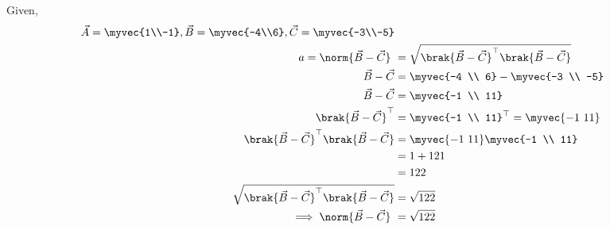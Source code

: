 \solution
Given, 
\begin{align}
\vec{A} = \myvec{1\\-1},
\vec{B} = \myvec{-4\\6},
\vec{C} = \myvec{-3\\-5} \\  
a =  \norm{\vec{B}-\vec{C}}\ &=  \sqrt{\brak{\vec{B}-\vec{C}}^{\top}\brak{\vec{B}-\vec{C}}} \\
 \vec{B}-\vec{C} &= \myvec{-4 \\ 6} - \myvec{-3 \\ -5} \\
 \vec{B}-\vec{C} &= \myvec{-1 \\ 11} \\
 \brak{\vec{B}-\vec{C}}^{\top} &= {\myvec{-1 \\ 11}}^{\top} = \myvec{-1 \ 11} \\
\brak{\vec{B}-\vec{C}}^{\top}\brak{\vec{B}-\vec{C}} &= \myvec{-1 \ 11} \myvec{-1 \\ 11}\\
             &= 1+121 \\
             &= 122 \\  
 \sqrt{\brak{\vec{B}-\vec{C}}^{\top}\brak{\vec{B}-\vec{C}}} &= \sqrt{122}	\\
\implies \norm{\vec{B}-\vec{C}}\ &= \sqrt{122} 
\end{align}
